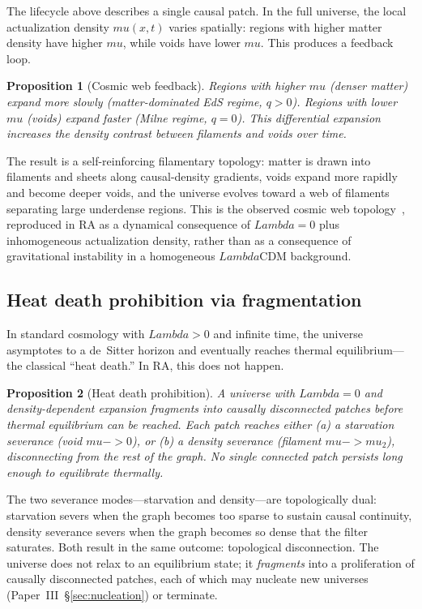 \documentclass[11pt]{article}
\def\Lambda{Lambda}%
\def\mu{mu}%
\def\to{->}%
\newtheorem{proposition}{Proposition}
\begin{document}
The lifecycle above describes a single causal patch. In the full universe, the local actualization density $\mu(x, t)$ varies spatially: regions with higher matter density have higher $\mu$, while voids have lower $\mu$. This produces a feedback loop.

\begin{proposition}[Cosmic web feedback]
\label{prop:cosmic_web}
Regions with higher $\mu$ (denser matter) expand more slowly (matter-dominated EdS regime, $q > 0$). Regions with lower $\mu$ (voids) expand faster (Milne regime, $q = 0$). This differential expansion increases the density contrast between filaments and voids over time.
\end{proposition}

The result is a self-reinforcing filamentary topology: matter is drawn into filaments and sheets along causal-density gradients, voids expand more rapidly and become deeper voids, and the universe evolves toward a web of filaments separating large underdense regions. This is the observed cosmic web topology~\cite{Cautun2014}, reproduced in RA as a dynamical consequence of $\Lambda = 0$ plus inhomogeneous actualization density, rather than as a consequence of gravitational instability in a homogeneous $\Lambda$CDM background.

\subsection{Heat death prohibition via fragmentation}
\label{sec:heat_death}

In standard cosmology with $\Lambda > 0$ and infinite time, the universe asymptotes to a de~Sitter horizon and eventually reaches thermal equilibrium---the classical ``heat death.'' In RA, this does not happen.

\begin{proposition}[Heat death prohibition]
\label{prop:heat_death}
A universe with $\Lambda = 0$ and density-dependent expansion fragments into causally disconnected patches before thermal equilibrium can be reached. Each patch reaches either (a) a starvation severance (void $\mu \to 0$), or (b) a density severance (filament $\mu \to \mu_2$), disconnecting from the rest of the graph. No single connected patch persists long enough to equilibrate thermally.
\end{proposition}

The two severance modes---starvation and density---are topologically dual: starvation severs when the graph becomes too sparse to sustain causal continuity, density severance severs when the graph becomes so dense that the filter saturates. Both result in the same outcome: topological disconnection. The universe does not relax to an equilibrium state; it \emph{fragments} into a proliferation of causally disconnected patches, each of which may nucleate new universes (Paper~III~\S\ref{sec:nucleation}) or terminate.
\end{document}
